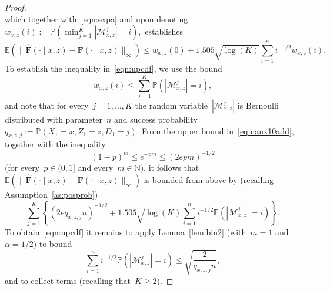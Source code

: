 \documentclass[11pt, a4paper]{article}
\newcommand{\N}{\mathbb{N}}
\theoremstyle{definition}
\begin{document}
\begin{proof}
\begin{equation*}
\end{equation*}
%
which together with~\eqref{eqn:expa} and upon denoting~$w_{x, z}(i) := \mathbb{P}\left(\min_{j = 1}^K |\mathcal{M}_{x, z}^j| = i\right),$ establishes
%
\begin{equation}\label{eqn:aux10add}
\mathbb{E}\left(\| \hat{\bm{F}}(\cdot \mid x, z) - \bm{F}(\cdot\mid x, z)\|_{\infty} \right) \leq  w_{x, z}(0) + 1.505 \sqrt{\log(K)} \sum_{i = 1}^n  i^{-1/2} w_{x, z}(i).
\end{equation}
%
To establish the inequality in~\eqref{eqn:upcdf}, we use the bound
%
\begin{equation*}
w_{x,z}(i) \leq \sum_{j = 1}^K \mathbb{P} \left( |\mathcal{M}_{x,z}^j| = i  \right),
\end{equation*}
%
and note that for every~$j = 1, \hdots, K$ the random variable~$|\mathcal{M}_{x,z}^j|$ is Bernoulli distributed with parameter~$n$ and success probability~$q_{x, z, j} := \mathbb{P}(X_1 = x, Z_1 = z, D_1 = j)$. From the upper bound in~\eqref{eqn:aux10add}, together with the inequality~
\begin{equation}\label{eqn:auxin}
(1-p)^m \leq e^{-pm} \leq (2epm)^{-1/2}
\end{equation}
(for every~$p \in (0, 1]$ and every~$m \in \N$), it follows that~$\mathbb{E} ( \| \hat{\bm{F}}(\cdot \mid x, z) - \bm{F}(\cdot \mid x, z) \|_{\infty} )$ is bounded from above by (recalling Assumption~\ref{as:posprob})
%
\begin{equation*}
\sum_{j = 1}^K \left\{ (2eq_{x, z, j}n)^{-1/2} +  1.505 \sqrt{\log(K)}\sum_{i = 1}^n i^{-1/2} \mathbb{P} ( |\mathcal{M}_{x,z}^j| = i  )\right\}.
\end{equation*}
%
To obtain~\eqref{eqn:upcdf} it remains to apply Lemma~\ref{lem:bin2} (with~$m = 1$ and~$\alpha = 1/2$) to bound
%
\begin{equation*}
\sum_{i = 1}^n i^{-1/2} \mathbb{P} \left( |\mathcal{M}_{x,z}^j| = i  \right) \leq  \sqrt{\frac{2}{q_{x, z, j} n}},
\end{equation*}
%
and to collect terms (recalling that~$K \geq 2$).


\end{proof}
\end{document}
